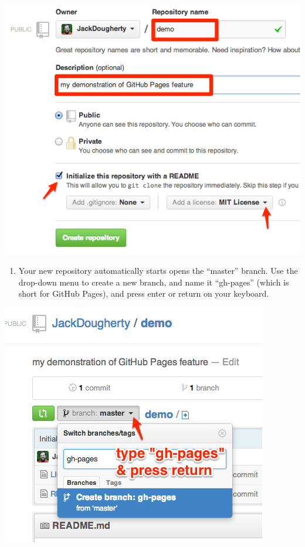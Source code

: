 \documentclass[
  english,
]{book}
\providecommand{\tightlist}{%
  \setlength{\itemsep}{0pt}\setlength{\parskip}{0pt}}
\begin{document}
\includegraphics{images/08-github/GitHub-CreateRepo.png}

\begin{enumerate}
\def\labelenumi{\arabic{enumi})}
\setcounter{enumi}{2}
\tightlist
\item
  Your new repository automatically starts opens the ``master'' branch. Use the drop-down menu to create a new branch, and name it ``gh-pages'' (which is short for GitHub Pages), and press enter or return on your keyboard.
\end{enumerate}

\includegraphics{images/08-github/GitHub-CreateBranch.png}
\end{document}
